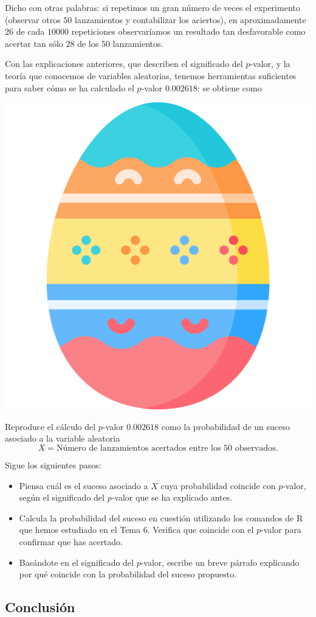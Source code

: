 \documentclass[
  notoc,
  nobib,
  degree=mec]{mnye}
\begin{document}
Dicho con otras palabras: si repetimos un gran número de veces el experimento (observar otros \(50\) lanzamientos y contabilizar los aciertos), en aproximadamente \(26\) de cada \(10000\) repeticiones observaríamos un resultado tan desfavorable como acertar tan sólo \(28\) de los \(50\) lanzamientos.

Con las explicaciones anteriores, que describen el significado del \(p\)-valor, y la teoría que conocemos de variables aleatorias, tenemos herramientas suficientes para saber cómo se ha calculado el \(p\)-valor \(0.002618\): se obtiene como

\begin{center}\includegraphics[width=0.2\linewidth]{easterEgg/easter-egg} \end{center}

\begin{ebox}

Reproduce el cálculo del \(p\)-valor \(0.002618\) como la probabilidad de un suceso asociado a la variable aleatoria
\[
  X = \text{Número de lanzamientos acertados entre los } 50 \text{ observados}.
\]

Sigue los siguientes pasos:

\begin{itemize}
\item
  Piensa cuál es el suceso asociado a \(X\) cuya probabilidad coincide con \(p\)-valor, según el significado del \(p\)-valor que se ha explicado antes.
\item
  Calcula la probabilidad del suceso en cuestión utilizando los comandos de \textsf{R} que hemos estudiado en el Tema 6. Verifica que coincide con el \(p\)-valor para confirmar que has acertado.
\item
  Basándote en el significado del \(p\)-valor, escribe un breve párrafo explicando por qué coincide con la probabilidad del suceso propuesto.
\end{itemize}

\end{ebox}

\hypertarget{conclusiuxf3n}{%
\subsection{Conclusión}\label{conclusiuxf3n}}
\end{document}
